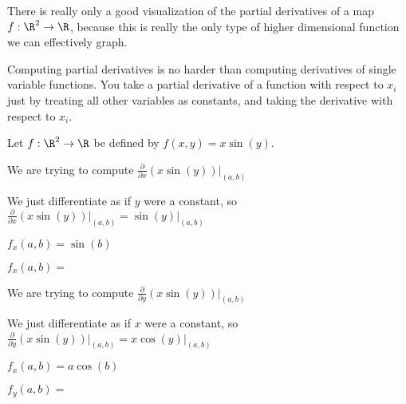 \documentclass{ximera}
\begin{document}
	\begin{example}
		There is really only a good visualization of the partial derivatives of a map  $f: \R^2 \to \R$, 
		because this is really the only type of higher dimensional function we can effectively graph.
		
		
		
		
		
	\end{example}
	
	Computing partial derivatives is no harder than computing derivatives of single variable functions.  You take a 
	 partial derivative of a function with respect to $x_i$ just by treating all other variables as constants, and taking the derivative with respect to $x_i$.
	
	\begin{question}
		
	Let $f:\R^2 \to \R$ be defined by $f(x,y) = x\sin(y)$.  
	\begin{solution}
		\begin{hint}
			We are trying to compute $\frac{\partial}{\partial x} \left(x \sin(y)\right)\big|_{(a,b)}$
		\end{hint}
		\begin{hint}
			We just differentiate as if $y$ were a constant, so 
			 $\frac{\partial}{\partial x} \left(x \sin(y)\right)\big|_{(a,b)} = \sin(y)\big|_{(a,b)}$
		\end{hint}
		\begin{hint}
			$f_x(a,b) = \sin(b)$
		\end{hint}
		$f_x(a,b) = $ 
	\end{solution}
	
	\begin{solution}
	\begin{hint}
			We are trying to compute $\frac{\partial}{\partial y} \left(x \sin(y)\right)\big|_{(a,b)}$
		\end{hint}
		\begin{hint}
			We just differentiate as if $x$ were a constant, so 
			 $\frac{\partial}{\partial y} \left(x \sin(y)\right)\big|_{(a,b)} = x\cos(y)\big|_{(a,b)}$
		\end{hint}
		\begin{hint}
			$f_x(a,b) = a\cos(b)$
		\end{hint}
		$f_y(a,b) = $ \answer{$a(cos(b))$}
	\end{solution}
	
	\end{question}
	
\end{document}
